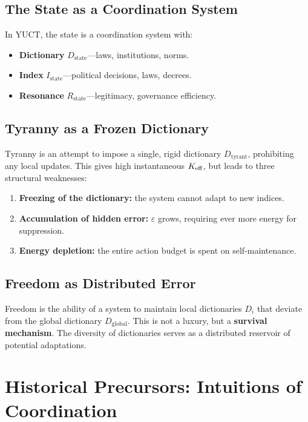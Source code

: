 \documentclass[12pt,a4paper]{article}
\newcommand{\eps}{\varepsilon}
\begin{document}
	\subsection{The State as a Coordination System}
	
	In YUCT, the state is a coordination system with:
	
	\begin{itemize}
		\item \textbf{Dictionary} \(D_{\text{state}}\)—laws, institutions, norms.
		\item \textbf{Index} \(I_{\text{state}}\)—political decisions, laws, decrees.
		\item \textbf{Resonance} \(R_{\text{state}}\)—legitimacy, governance efficiency.
	\end{itemize}
	
	\subsection{Tyranny as a Frozen Dictionary}
	
	Tyranny is an attempt to impose a single, rigid dictionary \(D_{\text{tyrant}}\), prohibiting any local updates. This gives high instantaneous \(\Keff\), but leads to three structural weaknesses:
	
	\begin{enumerate}
		\item \textbf{Freezing of the dictionary:} the system cannot adapt to new indices.
		\item \textbf{Accumulation of hidden error:} \(\eps\) grows, requiring ever more energy for suppression.
		\item \textbf{Energy depletion:} the entire action budget is spent on self-maintenance.
	\end{enumerate}
	
	\subsection{Freedom as Distributed Error}
	
	Freedom is the ability of a system to maintain local dictionaries \(D_i\) that deviate from the global dictionary \(D_{\text{global}}\). This is not a luxury, but a \textbf{survival mechanism}. The diversity of dictionaries serves as a distributed reservoir of potential adaptations.
	
	\section{Historical Precursors: Intuitions of Coordination}
	
\end{document}

